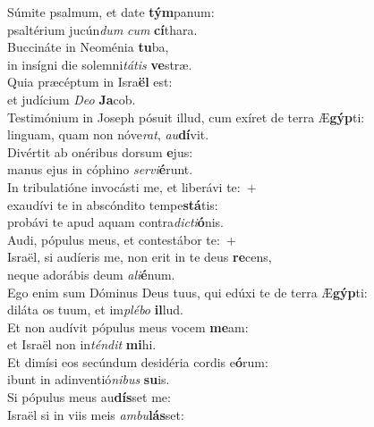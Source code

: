 \evenverse Súmite psalmum, et date \textbf{tým}panum:~\*\\
\evenverse psaltérium jucún\textit{dum} \textit{cum} \textbf{cí}thara.\\
\oddverse Buccináte in Neoménia \textbf{tu}ba,~\*\\
\oddverse in insígni die solemni\textit{tá}\textit{tis} \textbf{ve}stræ.\\
\evenverse Quia præcéptum in Isra\textbf{ël} est:~\*\\
\evenverse et judícium \textit{De}\textit{o} \textbf{Ja}cob.\\
\oddverse Testimónium in Joseph pósuit illud, cum exíret de terra Æ\textbf{gýp}ti:~\*\\
\oddverse linguam, quam non nóve\textit{rat}, \textit{au}\textbf{dí}vit.\\
\evenverse Divértit ab onéribus dorsum \textbf{e}jus:~\*\\
\evenverse manus ejus in cóphino \textit{ser}\textit{vi}\textbf{é}runt.\\
\oddverse In tribulatióne invocásti me, et liberávi te:~+\\
\oddverse  exaudívi te in abscóndito tempe\textbf{stá}tis:~\*\\
\oddverse probávi te apud aquam contra\textit{di}\textit{cti}\textbf{ó}nis.\\
\evenverse Audi, pópulus meus, et contestábor te:~+\\
\evenverse  Israël, si audíeris me, non erit in te deus \textbf{re}cens,~\*\\
\evenverse neque adorábis deum \textit{a}\textit{li}\textbf{é}num.\\
\oddverse Ego enim sum Dóminus Deus tuus, qui edúxi te de terra Æ\textbf{gýp}ti:~\*\\
\oddverse diláta os tuum, et im\textit{plé}\textit{bo} \textbf{il}lud.\\
\evenverse Et non audívit pópulus meus vocem \textbf{me}am:~\*\\
\evenverse et Israël non in\textit{tén}\textit{dit} \textbf{mi}hi.\\
\oddverse Et dimísi eos secúndum desidéria cordis e\textbf{ó}rum:~\*\\
\oddverse ibunt in adinventió\textit{ni}\textit{bus} \textbf{su}is.\\
\evenverse Si pópulus meus au\textbf{dís}set me:~\*\\
\evenverse Israël si in viis meis \textit{am}\textit{bu}\textbf{lás}set:\\
